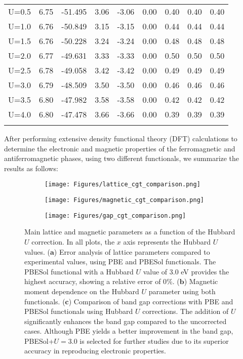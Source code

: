 \begin{table}[H]
\begin{tabular}{cccccc|ccc}
		U=0.5 & 6.75 & -51.495 & 3.06 & -3.06 & 0.00 & 0.40 & 0.40 & 0.40 \\
		U=1.0 & 6.76 & -50.849 & 3.15 & -3.15 & 0.00 & 0.44 & 0.44 & 0.44 \\
		U=1.5 & 6.76 & -50.228 & 3.24 & -3.24 & 0.00 & 0.48 & 0.48 & 0.48 \\
		U=2.0 & 6.77 & -49.631 & 3.33 & -3.33 & 0.00 & 0.50 & 0.50 & 0.50 \\
		U=2.5 & 6.78 & -49.058 & 3.42 & -3.42 & 0.00 & 0.49 & 0.49 & 0.49 \\
		U=3.0 & 6.79 & -48.509 & 3.50 & -3.50 & 0.00 & 0.46 & 0.46 & 0.46 \\
		U=3.5 & 6.80 & -47.982 & 3.58 & -3.58 & 0.00 & 0.42 & 0.42 & 0.42 \\
		U=4.0 & 6.80 & -47.478 & 3.66 & -3.66 & 0.00 & 0.39 & 0.39 & 0.39 \\
		\bottomrule
		\bottomrule
		\label{tab:4.4}
	\end{tabular}
\end{table}

After performing extensive density functional theory (DFT) calculations to determine the electronic and magnetic properties of the ferromagnetic and antiferromagnetic phases, using two different functionals, we summarize the results as follows:

\begin{figure}[H]
	\centering
	\begin{subfigure}{.50\textwidth}
		\centering
		\texttt{[image: Figures/lattice\_cgt\_comparison.png]}
	\end{subfigure}%
	\hfill %
	\begin{subfigure}{.50\textwidth}
		\centering
		\texttt{[image: Figures/magnetic\_cgt\_comparison.png]}
	\end{subfigure}
	\begin{subfigure}{.60\textwidth}
		\centering
		\texttt{[image: Figures/gap\_cgt\_comparison.png]}
	\end{subfigure}
	\caption{Main lattice and magnetic parameters as a function of the Hubbard $U$ correction. In all plots, the $x$ axis represents the Hubbard $U$ values. ($\mathbf{a}$) Error analysis of lattice parameters compared to experimental values, using PBE and PBESol functionals. The PBESol functional with a Hubbard $U$ value of 3.0 eV provides the highest accuracy, showing a relative error of 0$\%$. ($\mathbf{b}$) Magnetic moment dependence on the Hubbard $U$ parameter using both functionals. ($\mathbf{c}$) Comparison of band gap corrections with PBE and PBESol functionals using Hubbard $U$ corrections. The addition of $U$ significantly enhances the band gap compared to the uncorrected cases. Although PBE yields a better improvement in the band gap, PBESol+$U=3.0$ is selected for further studies due to its superior accuracy in reproducing electronic properties.}
	\label{fig:4.7}
\end{figure}

